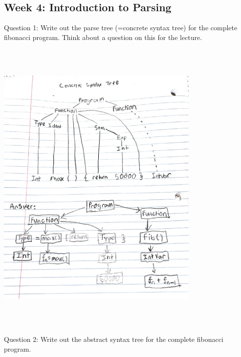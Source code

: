 \documentclass{article}
\theoremstyle{theorem}
\theoremstyle{definition}
\theoremstyle{remark}
\begin{document}
\subsection{Week 4: Introduction to Parsing}
Question 1: Write out the parse tree (=concrete syntax tree) for the complete fibonacci program. Think about a question on this for the lecture.
\medskip\begin{center}
\includegraphics[width=10cm, height=15cm]{Week4Q1.pdf}
\end{center}
Question 2: Write out the abstract syntax tree for the complete fibonacci program. 
\end{document}

